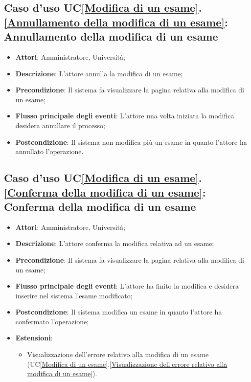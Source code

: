 \subsection{Caso d'uso UC\ref{Modifica di un esame}.\ref{Annullamento della modifica di un esame}: Annullamento della modifica di un esame}
\begin{itemize}
	\item \textbf{Attori}: Amministratore, Università;
	\item \textbf{Descrizione}: L'attore annulla la modifica di un esame;
	
	\item \textbf{Precondizione}: Il sistema fa visualizzare la pagina relativa alla modifica di un esame;
	
	
	\item \textbf{Flusso principale degli eventi}: L'attore una volta iniziata la modifica desidera annullare il processo;
	
	\item \textbf{Postcondizione}: Il sistema non modifica più un esame in quanto l'attore ha annullato l'operazione.
	
	
\end{itemize}

\subsection{Caso d'uso UC\ref{Modifica di un esame}.\ref{Conferma della modifica di un esame}: Conferma della modifica di un esame}
\begin{itemize}
	\item \textbf{Attori}: Amministratore, Università;
	\item \textbf{Descrizione}: L'attore conferma la modifica relativa ad un esame;
	
	\item \textbf{Precondizione}: Il sistema fa visualizzare la pagina relativa alla modifica di un esame;
	
	\item \textbf{Flusso principale degli eventi}: L'attore ha finito la modifica e desidera inserire nel sistema l'esame modificato;
	
	\item \textbf{Postcondizione}: Il sistema modifica un esame in quanto l'attore ha confermato l'operazione;
	
	
	\item \textbf{Estensioni}:
	\begin{itemize}
		\item Visualizzazione dell'errore relativo alla modifica di un esame (UC\ref{Modifica di un esame}.\ref{Visualizzazione dell'errore relativo alla modifica di un esame}).
	\end{itemize}
\end{itemize}

